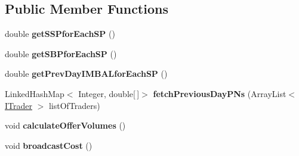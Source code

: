 \subsection*{Public Member Functions}
\begin{DoxyCompactItemize}
\item 
\hypertarget{classuk_1_1ac_1_1dmu_1_1iesd_1_1cascade_1_1market_1_1astem_1_1operators_1_1_settlement_company_ac4e50c94b593628281162d280a1c3968}{double {\bfseries get\-S\-S\-Pfor\-Each\-S\-P} ()}\label{classuk_1_1ac_1_1dmu_1_1iesd_1_1cascade_1_1market_1_1astem_1_1operators_1_1_settlement_company_ac4e50c94b593628281162d280a1c3968}

\item 
\hypertarget{classuk_1_1ac_1_1dmu_1_1iesd_1_1cascade_1_1market_1_1astem_1_1operators_1_1_settlement_company_a270ee1a3d0c14a1518c07a0ffa9f2c4d}{double {\bfseries get\-S\-B\-Pfor\-Each\-S\-P} ()}\label{classuk_1_1ac_1_1dmu_1_1iesd_1_1cascade_1_1market_1_1astem_1_1operators_1_1_settlement_company_a270ee1a3d0c14a1518c07a0ffa9f2c4d}

\item 
\hypertarget{classuk_1_1ac_1_1dmu_1_1iesd_1_1cascade_1_1market_1_1astem_1_1operators_1_1_settlement_company_a6487a8f7db832d82ce2ad1191b4f5e4d}{double {\bfseries get\-Prev\-Day\-I\-M\-B\-A\-Lfor\-Each\-S\-P} ()}\label{classuk_1_1ac_1_1dmu_1_1iesd_1_1cascade_1_1market_1_1astem_1_1operators_1_1_settlement_company_a6487a8f7db832d82ce2ad1191b4f5e4d}

\item 
\hypertarget{classuk_1_1ac_1_1dmu_1_1iesd_1_1cascade_1_1market_1_1astem_1_1operators_1_1_settlement_company_a3dd83f9e0d0b8d0fd81c380bce53ca36}{Linked\-Hash\-Map$<$ Integer, double\mbox{[}$\,$\mbox{]}$>$ {\bfseries fetch\-Previous\-Day\-P\-Ns} (Array\-List$<$ \hyperlink{interfaceuk_1_1ac_1_1dmu_1_1iesd_1_1cascade_1_1market_1_1_i_trader}{I\-Trader} $>$ list\-Of\-Traders)}\label{classuk_1_1ac_1_1dmu_1_1iesd_1_1cascade_1_1market_1_1astem_1_1operators_1_1_settlement_company_a3dd83f9e0d0b8d0fd81c380bce53ca36}

\item 
\hypertarget{classuk_1_1ac_1_1dmu_1_1iesd_1_1cascade_1_1market_1_1astem_1_1operators_1_1_settlement_company_ab9cecd34f98cfb21241470e875767d72}{void {\bfseries calculate\-Offer\-Volumes} ()}\label{classuk_1_1ac_1_1dmu_1_1iesd_1_1cascade_1_1market_1_1astem_1_1operators_1_1_settlement_company_ab9cecd34f98cfb21241470e875767d72}

\item 
\hypertarget{classuk_1_1ac_1_1dmu_1_1iesd_1_1cascade_1_1market_1_1astem_1_1operators_1_1_settlement_company_a60e4f853f6cc0bfe3caed3cce86e9e6d}{void {\bfseries broadcast\-Cost} ()}\label{classuk_1_1ac_1_1dmu_1_1iesd_1_1cascade_1_1market_1_1astem_1_1operators_1_1_settlement_company_a60e4f853f6cc0bfe3caed3cce86e9e6d}


\end{DoxyCompactItemize}
